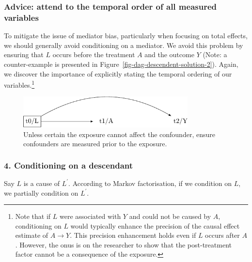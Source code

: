 \documentclass[
  singlecolumn]{article}
\begin{document}
\hypertarget{advice-attend-to-the-temporal-order-of-all-measured-variables-2}{%
\subsubsection{Advice: attend to the temporal order of all measured
variables}\label{advice-attend-to-the-temporal-order-of-all-measured-variables-2}}

To mitigate the issue of mediator bias, particularly when focusing on
total effects, we should generally avoid conditioning on a mediator. We
avoid this problem by ensuring that \(L\) occurs before the treatment
\(A\) and the outcome \(Y\) (Note: a counter-example is presented in
Figure~\ref{fig-dag-descendent-solution-2}). Again, we discover the
importance of explicitly stating the temporal ordering of our
variables.\footnote{Note that if \(L\) were associated with \(Y\) and
  could not be caused by \(A\), conditioning on \(L\) would typically
  enhance the precision of the causal effect estimate of \(A \to Y\).
  This precision enhancement holds even if \(L\) occurs after \(A\).
  However, the onus is on the researcher to show that the post-treatment
  factor cannot be a consequence of the exposure.}

\begin{figure}

{\centering \includegraphics[width=0.8\textwidth,height=\textheight]{causal-dags_files/figure-pdf/fig-dag-mediator-solution-1.pdf}

}

\caption{\label{fig-dag-mediator-solution}Unless certain the exposure
cannot affect the confounder, ensure confounders are measured prior to
the exposure.}

\end{figure}

\hypertarget{conditioning-on-a-descendant}{%
\subsubsection{4. Conditioning on a
descendant}\label{conditioning-on-a-descendant}}

Say \(L\) is a cause of \(L^\prime\). According to Markov factorisation,
if we condition on \(L\), we partially condition on \(L^\prime\).
\end{document}

